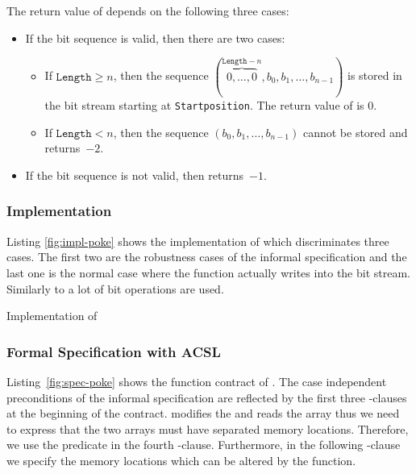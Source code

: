 The return value of \poke depends on the following three cases:

\begin{itemize}
\item 
If the bit sequence is valid, then there are two cases:

\begin{itemize}
\item
If $\texttt{Length} \geq n$, then  the sequence
$(\overbrace{0,\ldots,0}^{\texttt{Length}-n},b_0, b_1,\ldots,b_{n - 1})$
is stored in the bit stream starting at \texttt{Startposition}.
The return value of \poke is 0.

\item
If $\texttt{Length} < n$, then the
sequence $(b_0, b_1,\ldots,b_{n - 1})$ cannot be stored and\\
\poke returns~$-2$.
\end{itemize}

\item 
If the bit sequence is not valid, then \poke returns~$-1$.
\end{itemize}

\subsubsection{Implementation}
\label{sec:impl-poke}
Listing \ref{fig:impl-poke} shows the implementation of \poke
which discriminates three cases. The first two are the robustness cases
of the informal specification and the last one is
the normal case where the function actually writes into the bit stream.
Similarly to \peek a lot of bit operations are used. 

\begin{listing}[hbt]
\begin{minipage}{\textwidth}

\end{minipage}
\caption{\label{fig:impl-poke} Implementation of \poke}
\end{listing}



\clearpage
\subsubsection{Formal Specification with ACSL}
\label{formal-poke}

Listing~\ref{fig:spec-poke} shows the function contract of \poke.
The case independent preconditions of the informal specification 
are reflected by the  first three -clauses at the beginning of the contract.
\poke modifies the  and reads the array
 thus we need to express 
that the two arrays must have separated memory locations. 
Therefore, we use the predicate  in the fourth -clause.
Furthermore, in the following -clause we specify the memory locations which 
can be altered by the function.

